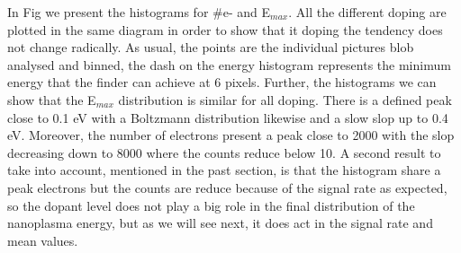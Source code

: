 In Fig\label{ref:XeCahisto} we present the histograms for $\#$e- and E$_{max}$. All the different doping are plotted in the same diagram in order to show that it doping the tendency does not change radically. As usual, the points are the individual pictures blob analysed and binned, the dash on the energy histogram represents the minimum energy that the finder can achieve at 6 pixels. Further, the histograms we can show that the E$_{max}$ distribution is similar for all doping.  There is a defined peak close to 0.1 eV with a Boltzmann distribution likewise and a slow slop up to 0.4 eV. Moreover, the number of electrons present a peak close to 2000 with the slop decreasing down to 8000 where the counts reduce below 10. A second result to take into account, mentioned in the past section, is that the histogram share a peak electrons but the counts are reduce because of the signal rate as expected, so the dopant level does not play a big role in  the final distribution of the nanoplasma energy, but as we will see next, it does act in the signal rate and mean values.

